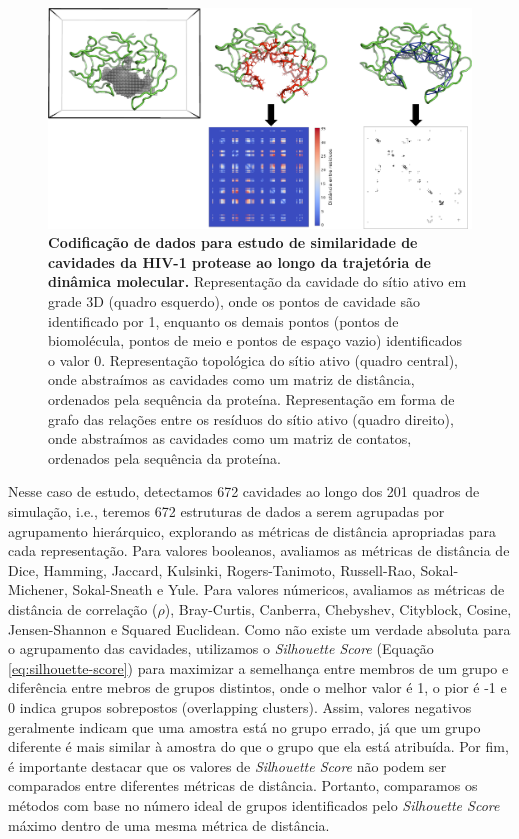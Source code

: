 \documentclass[Portugues]{phdquali}
\def\ie{i.e.\onedot}
\begin{document}
\begin{figure}[h]
  \centering
  \includegraphics[scale=1]{images/HIV-1-representation.png}
  \caption[Codificação de dados para estudo de similaridade de cavidades da HIV-1 protease ao longo da trajetória de dinâmica molecular]{\textbf{Codificação de dados para estudo de similaridade de cavidades da HIV-1 protease ao longo da trajetória de dinâmica molecular.} Representação da cavidade do sítio ativo em grade 3D (quadro esquerdo), onde os pontos de cavidade são identificado por 1, enquanto os demais pontos (pontos de biomolécula, pontos de meio e pontos de espaço vazio) identificados o valor 0. Representação topológica do sítio ativo (quadro central), onde abstraímos as cavidades como um matriz de distância, ordenados pela sequência da proteína. Representação em forma de grafo das relações entre os resíduos do sítio ativo (quadro direito), onde abstraímos as cavidades como um matriz de contatos, ordenados pela sequência da proteína.}
  \label{fig:hiv-1-representation}
\end{figure}

Nesse caso de estudo, detectamos 672 cavidades ao longo dos 201 quadros de simulação, \ie, teremos 672 estruturas de dados a serem agrupadas por agrupamento hierárquico, explorando as métricas de distância apropriadas para cada representação. Para valores booleanos, avaliamos as métricas de distância de Dice, Hamming, Jaccard, Kulsinki, Rogers-Tanimoto, Russell-Rao, Sokal-Michener, Sokal-Sneath e Yule. Para valores númericos, avaliamos as métricas de distância de correlação ($\rho$), Bray-Curtis, Canberra, Chebyshev, Cityblock, Cosine, Jensen-Shannon e Squared Euclidean. Como não existe um verdade absoluta para o agrupamento das cavidades, utilizamos o \textit{Silhouette Score} (Equação \ref{eq:silhouette-score}) para maximizar a semelhança entre membros de um grupo e diferência entre mebros de grupos distintos, onde o melhor valor é 1, o pior é -1 e 0 indica grupos sobrepostos (overlapping clusters). Assim, valores negativos geralmente indicam que uma amostra está no grupo errado, já que um grupo diferente é mais similar à amostra do que o grupo que ela está atribuída. Por fim, é importante destacar que os valores de \textit{Silhouette Score} não podem ser comparados entre diferentes métricas de distância. Portanto, comparamos os métodos com base no número ideal de grupos identificados pelo \textit{Silhouette Score} máximo dentro de uma mesma métrica de distância.
\end{document}

